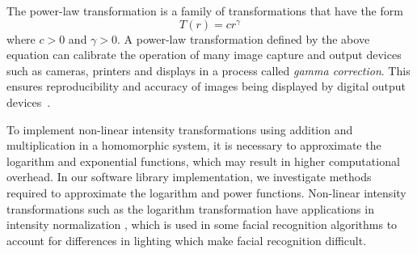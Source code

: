 The power-law transformation is a family of transformations that have the form
\begin{equation}
    T\left(r\right) = c r^{\gamma}
\end{equation}
where $c>0$ and $\gamma > 0$.
A power-law transformation defined by the above equation can calibrate the operation of many image capture and output devices such as cameras, printers and displays in a process called \textit{gamma correction}. This ensures reproducibility and accuracy of images being displayed by digital output devices~\cite{gonzalez_digital_2008}.

To implement non-linear intensity transformations using addition and multiplication in a homomorphic system, it is necessary to approximate the logarithm and exponential functions, which may result in higher computational overhead. In our software library implementation, we investigate methods required to approximate the logarithm and power functions. Non-linear intensity transformations such as the logarithm transformation have applications in intensity normalization \cite{oravec_illumination_2010}, which is used in some facial recognition algorithms to account for differences in lighting which make facial recognition difficult.



